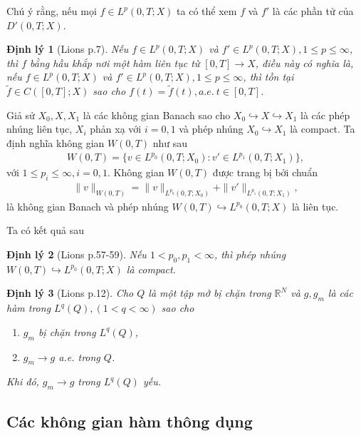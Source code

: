 \documentclass[12pt,a4paper]{article}
\newtheorem{theorem}{Định lý}[section]
\theoremstyle{definition}
\theoremstyle{definition}
\begin{document}
Chú ý rằng, nếu mọi $f \in L^p(0,T;X)$ ta có thể xem $f$ và $f'$ là các phần tử của $D'(0,T;X)$.

\begin{theorem}[Lions \cite{Lions} p.7]
Nếu $f \in L^p(0,T;X)$ và $f' \in L^p(0,T;X), 1 \le p \le \infty$, thì $f$ bằng hầu khắp nơi một hàm liên tục từ $[0,T] \to X$, điều này có nghĩa là, nếu $f \in L^p(0,T;X)$ và $f' \in L^p(0,T;X), 1 \le p \le \infty$, thì tồn tại $\tilde{f} \in C([0,T];X)$ sao cho $f(t) = \tilde{f}(t), a.e. \: t \in [0,T]$.
\end{theorem}

Giả sử $X_0, X, X_1$ là các không gian Banach sao cho $X_0 \hookrightarrow X \hookrightarrow X_1$ là các phép nhúng liên tục, $X_i$ phản xạ với $i=0,1$ và phép nhúng $X_0 \hookrightarrow X_1$ là compact. Ta định nghĩa không gian $W(0,T)$ như sau
\begin{align*}
    W(0,T) = \{ v \in L^{p_0}(0,T;X_0) : v' \in L^{p_1}(0,T;X_1) \},
\end{align*}
với $1 \le p_i \le \infty, i = 0,1$. Không gian $W(0,T)$ được trang bị bởi chuẩn
\begin{align*}
    \|v\|_{W(0,T)} = \|v\|_{L^{p_0}(0,T;X_0)} + \|v'\|_{L^{p_1}(0,T;X_1)},
\end{align*}
là không gian Banach và phép nhúng $W(0,T) \hookrightarrow L^{p_0}(0,T;X)$ là liên tục.

Ta có kết quả sau

\begin{theorem}[Lions \cite{Lions} p.57-59]
Nếu $1 < p_0, p_1 < \infty$, thì phép nhúng $W(0,T) \hookrightarrow L^{p_0}(0,T;X)$ là compact.
\end{theorem}

\begin{theorem}[Lions \cite{Lions} p.12]
Cho $Q$ là một tập mở bị chặn trong $\mathbb{R}^N$ và $g,g_m$ là các hàm trong $L^q(Q), (1 < q < \infty)$ sao cho
\begin{enumerate}
    \item[(i)] $g_m$ bị chặn trong $L^q(Q)$,
    \item[(ii)] $g_m \to g$ a.e. trong $Q$.
\end{enumerate}
Khi đó, $g_m \to g$ trong $L^q(Q)$ yếu.
\end{theorem}

\subsection{Các không gian hàm thông dụng}
\end{document}
